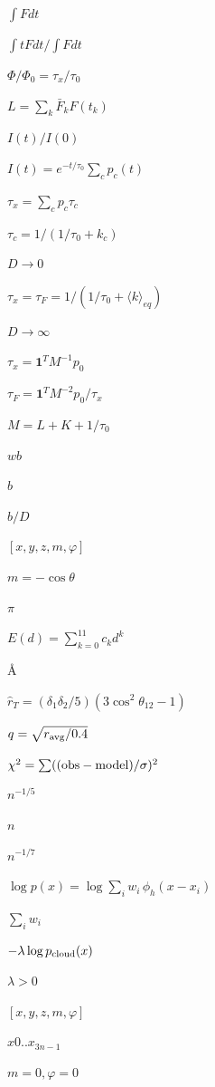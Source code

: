 \documentclass{article}
\begin{document}
$\int F dt$
\pagebreak

$\int t F dt / \int F dt$
\pagebreak

$\Phi/\Phi_0 = \tau_x / \tau_0$
\pagebreak

$L = \sum_k \bar F_k F(t_k)$
\pagebreak

$I(t)/I(0)$
\pagebreak

$I(t) = e^{-t/\tau_0} \sum_c p_c(t)$
\pagebreak

$\tau_x = \sum_c p_c \tau_c$
\pagebreak

$\tau_c = 1/(1/\tau_0 + k_c)$
\pagebreak

$D \to 0$
\pagebreak

$\tau_x = \tau_F = 1/(1/\tau_0 + \langle k\rangle_{eq})$
\pagebreak

$D \to \infty$
\pagebreak

$\tau_x = \mathbf 1^T M^{-1} p_0$
\pagebreak

$\tau_F = \mathbf 1^T M^{-2} p_0 / \tau_x$
\pagebreak

$M = L + K + 1/\tau_0$
\pagebreak

$w b$
\pagebreak

$b$
\pagebreak

$b/D$
\pagebreak

$[x, y, z, m, \varphi]$
\pagebreak

$m=-\cos\theta$
\pagebreak

$\pi$
\pagebreak

$E(d)=\sum_{k=0}^{11} c_k d^k$
\pagebreak

$\text{\AA}$
\pagebreak

$\hat r_T=(\delta_1\delta_2/5)(3\cos^2\theta_{12}-1)$
\pagebreak

$q=\sqrt{r_{\rm avg}/0.4}$
\pagebreak

$\chi^2=\sum (({\rm obs}-{\rm model})/\sigma)^2$
\pagebreak

$n^{-1/5}$
\pagebreak

$n$
\pagebreak

$n^{-1/7}$
\pagebreak

$\log p(x)=\log\sum_i w_i\,\phi_h(x-x_i)$
\pagebreak

$\sum_i w_i$
\pagebreak

$-\lambda \log p_{\rm cloud}(x)$
\pagebreak

$\lambda>0$
\pagebreak

$[x,y,z,m,\varphi]$
\pagebreak

$x0..x_{3n-1}$
\pagebreak

$m=0,\varphi=0$
\pagebreak
\end{document}
